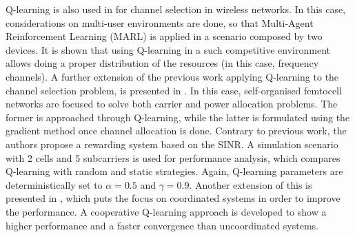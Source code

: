 \documentclass[12pt, a4paper,twoside]{tesi_upf}
\begin{document}
				Q-learning is also used in \cite{li2009multi} for channel selection in wireless networks. In this case, considerations on multi-user environments are done, so that Multi-Agent Reinforcement Learning (MARL) is applied in a scenario composed by two devices. It is shown that using Q-learning in a such competitive environment allows doing a proper distribution of the resources (in this case, frequency channels). A further extension of the previous work applying Q-learning to the channel selection problem, is presented in \cite{bennis2010q}. In this case, self-organised femtocell networks are focused to solve both carrier and power allocation problems. The former is approached through Q-learning, while the latter is formulated using the gradient method once channel allocation is done. Contrary to previous work, the authors propose a rewarding system based on the SINR. A simulation scenario with 2 cells and 5 subcarriers is used for performance analysis, which compares Q-learning with random and static strategies. Again, Q-learning parameters are deterministically set to $\alpha = 0.5$ and $\gamma = 0.9$.	Another extension of this is presented in \cite{bennis2011distributed}, which puts the focus on coordinated systems in order to improve the performance. A cooperative Q-learning approach is developed to show a higher performance and a faster convergence than uncoordinated systems.
					
\end{document}
